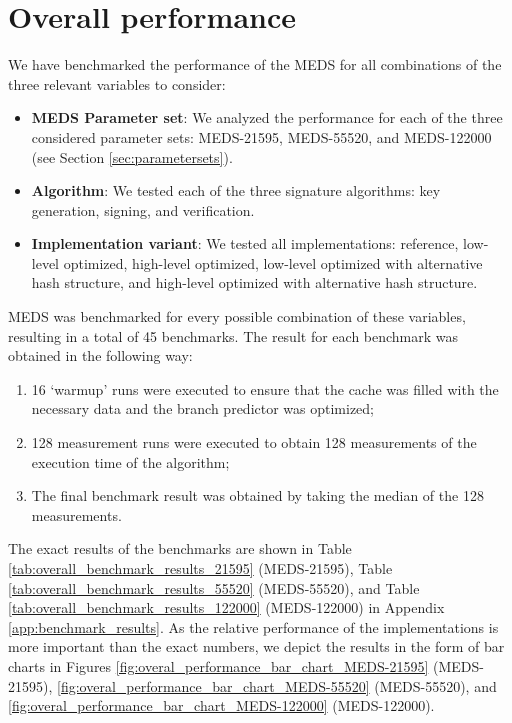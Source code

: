 \documentclass[11pt,a4paper]{report}
\theoremstyle{definition}
\begin{document}
\section{Overall performance}
\label{sec:overallperformance}
We have benchmarked the performance of the MEDS for all combinations of the three relevant variables to consider:
\begin{itemize}
  \item \textbf{MEDS Parameter set}: We analyzed the performance for each of the three considered parameter sets: MEDS-21595, MEDS-55520, and MEDS-122000 (see Section \ref{sec:parametersets}).
  \item \textbf{Algorithm}: We tested each of the three signature algorithms: key generation, signing, and verification.
  \item \textbf{Implementation variant}: We tested all implementations: reference, low-level optimized, high-level optimized, low-level optimized with alternative hash structure, and high-level optimized with alternative hash structure.
\end{itemize}
MEDS was benchmarked for every possible combination of these variables, resulting in a total of 45 benchmarks. The result for each benchmark was obtained in the following way:
\begin{enumerate}
  \item 16 `warmup' runs were executed to ensure that the cache was filled with the necessary data and the branch predictor was optimized;
  \item 128 measurement runs were executed to obtain 128 measurements of the execution time of the algorithm;
  \item The final benchmark result was obtained by taking the median of the 128 measurements.
\end{enumerate}

The exact results of the benchmarks are shown in Table \ref{tab:overall_benchmark_results_21595} (MEDS-21595), Table \ref{tab:overall_benchmark_results_55520} (MEDS-55520), and Table \ref{tab:overall_benchmark_results_122000} (MEDS-122000) in Appendix \ref{app:benchmark_results}. As the relative performance of the implementations is more important than the exact numbers, we depict the results in the form of bar charts in Figures \ref{fig:overal_performance_bar_chart_MEDS-21595} (MEDS-21595), \ref{fig:overal_performance_bar_chart_MEDS-55520} (MEDS-55520), and \ref{fig:overal_performance_bar_chart_MEDS-122000} (MEDS-122000).
\end{document}
